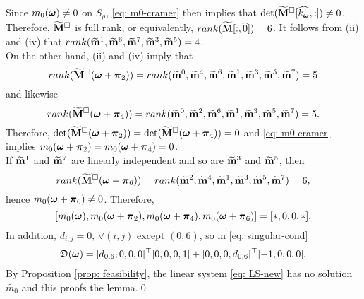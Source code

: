 Since $m_0(\V{\omega})\neq 0$ on $S_\rho$, \eqref{eq: m0-cramer} then implies that $\det(\Msub[\widehat{k_{\V{\omega}}},:])\neq 0$. Therefore, $\Msub$ is full rank, or equivalently, $rank(\M[:,\widehat{0}]) = 6$. It follows from  (ii) and (iv) that $rank(\mrow{1},\mrow{6},\mrow{7},\mrow{3},\mrow{5})= 4$.\\
On the other hand, (ii) and (iv) imply that $$rank(\Msub(\V{\omega}+\V{\pi}_2))=rank(\mrow{0},\mrow{4},\mrow{6},\mrow{1},\mrow{3},\mrow{5},\mrow{7})= 5$$ and likewise $$rank(\Msub(\V{\omega}+\V{\pi}_4))=rank(\mrow{0},\mrow{2},\mrow{6},\mrow{1},\mrow{3},\mrow{5},\mrow{7})= 5.$$ Therefore, $\det(\Msub(\V{\omega} + \V{\pi}_2)) = \det(\Msub(\V{\omega} + \V{\pi}_4)) = 0$ and \eqref{eq: m0-cramer} implies $m_0(\V{\omega}+\V{\pi}_2) = m_0(\V{\omega}+\V{\pi}_4) = 0$.\\
If $\mrow{1}$ and $\mrow{7}$ are linearly independent and so are $\mrow{3}$ and $\mrow{5}$, then $$rank(\Msub(\V{\omega}+\V{\pi}_6))=rank(\mrow{2},\mrow{4},\mrow{1},\mrow{3},\mrow{5},\mrow{7}) = 6,$$ hence $m_0(\V{\omega}+\V{\pi}_6)\neq 0$. Therefore, $$[m_0(\V{\omega}),m_0(\V{\omega}+\V{\pi}_2),m_0(\V{\omega}+\V{\pi}_4),m_0(\V{\omega}+\V{\pi}_6)] = [*,0,0,*].$$ In addition, $d_{i,j} = 0,\, \forall(i,j)$ except $(0,6)$, so in \eqref{eq: singular-cond} $$\mathfrak{D}(\V{\omega}) = [d_{0,6}, 0, 0,0]^\top [0,0,0,1] + [0,0,0,d_{0,6}]^\top [-1,0,0,0].$$  By Proposition \ref{prop: feasibility}, the linear system \eqref{eq: LS-new} has no solution $\widetilde{m_0}$ and this proofs the lemma.\qed

